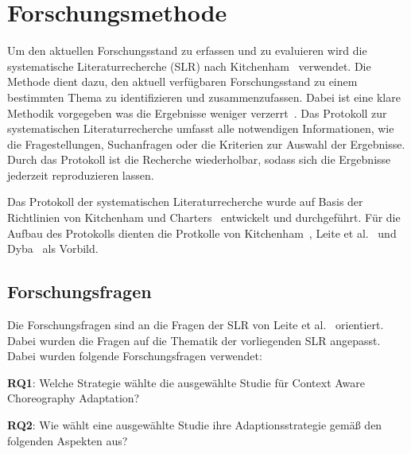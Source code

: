 \documentclass[conference,compsoc]{IEEEtran}
\begin{document}




\section{Forschungsmethode}
Um den aktuellen Forschungsstand zu erfassen und zu evaluieren wird die systematische Literaturrecherche (SLR) nach Kitchenham~\cite{kitchenham2004evidence,keele2007guidelines} verwendet. Die Methode dient dazu, den aktuell verfügbaren Forschungsstand zu einem bestimmten Thema zu identifizieren und zusammenzufassen. Dabei ist eine klare Methodik vorgegeben was die Ergebnisse weniger verzerrt~\cite{keele2007guidelines}.
Das Protokoll zur systematischen Literaturrecherche umfasst alle notwendigen Informationen, wie die Fragestellungen, Suchanfragen oder die Kriterien zur Auswahl der Ergebnisse. Durch das Protokoll ist die Recherche wiederholbar, sodass sich die Ergebnisse jederzeit reproduzieren lassen.

Das Protokoll der systematischen Literaturrecherche wurde auf Basis der Richtlinien von Kitchenham und Charters~\cite{keele2007guidelines} entwickelt und durchgeführt. Für die Aufbau des Protokolls dienten die Protkolle von Kitchenham~\cite{kitchenham2009systematic}, Leite et al.~\cite{leite2013systematic} und Dyba~\cite{dybaa2008empirical} als Vorbild.
\subsection{Forschungsfragen}
Die Forschungsfragen sind an die Fragen der SLR von Leite et al.~\cite{leite2013systematic} orientiert. Dabei wurden die Fragen auf die Thematik der vorliegenden SLR angepasst.
Dabei wurden folgende Forschungsfragen verwendet:


\textbf{RQ1}: Welche Strategie wählte die ausgewählte Studie für Context Aware Choreography Adaptation? 

\textbf{RQ2}: Wie wählt eine ausgewählte Studie ihre Adaptionsstrategie gemäß den folgenden Aspekten aus?
\end{document}
